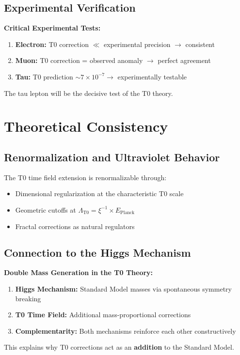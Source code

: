 \documentclass[12pt,a4paper]{article}
\newcommand{\xipar}{\xi}
\begin{document}
	\subsection{Experimental Verification}
	
	\begin{warning}
		\textbf{Critical Experimental Tests:}
		
		\begin{enumerate}
			\item \textbf{Electron:} T0 correction $\ll$ experimental precision $\rightarrow$ consistent
			\item \textbf{Muon:} T0 correction = observed anomaly $\rightarrow$ perfect agreement
			\item \textbf{Tau:} T0 prediction $\sim 7 \times 10^{-7} \rightarrow$ experimentally testable
		\end{enumerate}
		
		The tau lepton will be the decisive test of the T0 theory.
	\end{warning}
	
	\section{Theoretical Consistency}
	
	\subsection{Renormalization and Ultraviolet Behavior}
	
	The T0 time field extension is renormalizable through:
	
	\begin{itemize}
		\item Dimensional regularization at the characteristic T0 scale
		\item Geometric cutoffs at $\Lambda_{\text{T0}} = \xipar^{-1} \times E_{\text{Planck}}$
		\item Fractal corrections as natural regulators
	\end{itemize}
	
	\subsection{Connection to the Higgs Mechanism}
	
	\begin{breakthrough}
		\textbf{Double Mass Generation in the T0 Theory:}
		
		\begin{enumerate}
			\item \textbf{Higgs Mechanism:} Standard Model masses via spontaneous symmetry breaking
			\item \textbf{T0 Time Field:} Additional mass-proportional corrections
			\item \textbf{Complementarity:} Both mechanisms reinforce each other constructively
		\end{enumerate}
		
		This explains why T0 corrections act as an \textbf{addition} to the Standard Model.
	\end{breakthrough}
	
\end{document}
